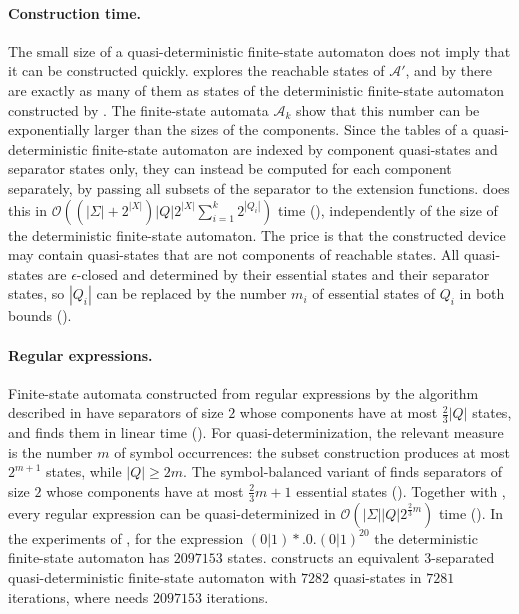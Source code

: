 \paragraph{Construction time.}
The small size of a quasi-deterministic finite-state automaton does not imply that it can
be constructed quickly.  explores the reachable states of
$\mathcal{A}'$, and by  there are exactly as many of them
as states of the deterministic finite-state automaton constructed by
. The finite-state automata $\mathcal{A}_k$ show that this number
can be exponentially larger than the sizes of the components. Since the tables of a
quasi-deterministic finite-state automaton are indexed by component quasi-states and
separator states only, they can instead be computed for each component separately, by
passing all subsets of the separator to the extension functions.
 does this in $\mathcal{O}((|\Sigma| + 2^{|X|}) |Q|
2^{|X|} \sum_{i=1}^k 2^{|Q_i|})$ time (), independently of
the size of the deterministic finite-state automaton. The price is that the constructed
device may contain quasi-states that are not components of reachable states. All
quasi-states are $\epsilon$-closed and determined by their essential states and their
separator states, so $|Q_i|$ can be replaced by the number $m_i$ of essential states of
$Q_i$ in both bounds ().

\paragraph{Regular expressions.}
Finite-state automata constructed from regular expressions by the algorithm described in
 have separators of size $2$ whose components have at most
$\frac{2}{3}|Q|$ states, and  finds them in linear time
(). For quasi-determinization, the relevant measure is the
number $m$ of symbol occurrences: the subset construction produces at most $2^{m+1}$
states, while $|Q| \geq 2m$. The symbol-balanced variant of
 finds separators of size $2$ whose components have at most
$\frac{2}{3}m + 1$ essential states (). Together
with , every regular expression can be
quasi-determinized in $\mathcal{O}(|\Sigma| |Q| 2^{\frac{2}{3}m})$ time
(). In the experiments of
, for the expression
$(0|1)*.0.(0|1)^{20}$ the deterministic finite-state automaton has $2097153$ states.
 constructs an equivalent $3$-separated
quasi-deterministic finite-state automaton with $7282$ quasi-states in $7281$ iterations,
where  needs $2097153$ iterations.

